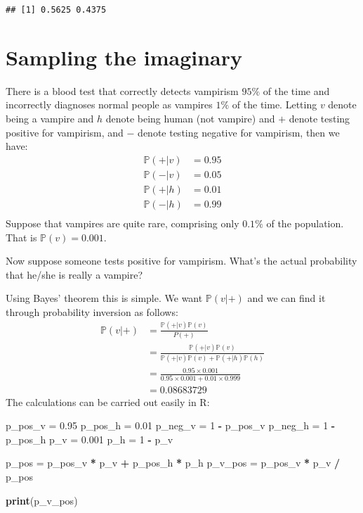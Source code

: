 \documentclass[
]{book}
\newenvironment{Shaded}{\begin{snugshade}}{\end{snugshade}}
\newcommand{\DecValTok}[1]{\textcolor[rgb]{0.00,0.00,0.81}{#1}}
\newcommand{\FloatTok}[1]{\textcolor[rgb]{0.00,0.00,0.81}{#1}}
\newcommand{\KeywordTok}[1]{\textcolor[rgb]{0.13,0.29,0.53}{\textbf{#1}}}
\newcommand{\NormalTok}[1]{#1}
\newcommand{\OperatorTok}[1]{\textcolor[rgb]{0.81,0.36,0.00}{\textbf{#1}}}
\newcommand{\StringTok}[1]{\textcolor[rgb]{0.31,0.60,0.02}{#1}}
\begin{document}
\begin{verbatim}
## [1] 0.5625 0.4375
\end{verbatim}

\hypertarget{sampling-the-imaginary}{%
\chapter{Sampling the imaginary}\label{sampling-the-imaginary}}

There is a blood test that correctly detects vampirism \(95\%\) of the time and incorrectly diagnoses normal people as vampires \(1\%\) of the time. Letting \(v\) denote being a vampire and \(h\) denote being human (not vampire) and \(+\) denote testing positive for vampirism, and \(-\) denote testing negative for vampirism, then we have:
\[
\begin{aligned}
\mathbb P(+|v) &= 0.95 \\
\mathbb P(-|v) &= 0.05 \\
\mathbb P(+|h) &= 0.01 \\
\mathbb P(-|h) &= 0.99 \\
\end{aligned}
\]
Suppose that vampires are quite rare, comprising only \(0.1\%\) of the population. That is \(\mathbb P(v) = 0.001\).

Now suppose someone tests positive for vampirism. What's the actual probability that he/she is really a vampire?

Using Bayes' theorem this is simple. We want \(\mathbb P(v|+)\) and we can find it through probability inversion as follows:
\[
\begin{aligned}
\mathbb P(v|+) &= \frac{\mathbb P(+|v) \mathbb P(v)}{P(+)} \\
&= \frac{\mathbb P(+|v) \mathbb P(v)}{\mathbb P(+|v)\mathbb P(v) + \mathbb P(+|h)\mathbb P(h)} \\
&= \frac{0.95\times 0.001}{0.95\times 0.001 + 0.01 \times 0.999} \\
&= 0.08683729
\end{aligned}
\]
The calculations can be carried out easily in R:

\begin{Shaded}
\begin{Highlighting}[]
\NormalTok{p_pos_v =}\StringTok{ }\FloatTok{0.95}
\NormalTok{p_pos_h =}\StringTok{ }\FloatTok{0.01}
\NormalTok{p_neg_v =}\StringTok{ }\DecValTok{1} \OperatorTok{-}\StringTok{ }\NormalTok{p_pos_v}
\NormalTok{p_neg_h =}\StringTok{ }\DecValTok{1} \OperatorTok{-}\StringTok{ }\NormalTok{p_pos_h}
\NormalTok{p_v =}\StringTok{ }\FloatTok{0.001}
\NormalTok{p_h =}\StringTok{ }\DecValTok{1} \OperatorTok{-}\StringTok{ }\NormalTok{p_v}

\NormalTok{p_pos =}\StringTok{ }\NormalTok{p_pos_v }\OperatorTok{*}\StringTok{ }\NormalTok{p_v }\OperatorTok{+}\StringTok{ }\NormalTok{p_pos_h }\OperatorTok{*}\StringTok{ }\NormalTok{p_h }
\NormalTok{p_v_pos =}\StringTok{ }\NormalTok{p_pos_v }\OperatorTok{*}\StringTok{ }\NormalTok{p_v }\OperatorTok{/}\StringTok{ }\NormalTok{p_pos}

\KeywordTok{print}\NormalTok{(p_v_pos)}
\end{Highlighting}
\end{Shaded}
\end{document}
